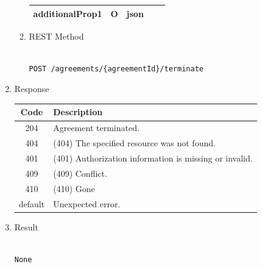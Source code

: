 \begin{enumerate}
\begin{enumerate}
\begin{center}
\begin{tabular}{|p{3cm}|l|p{3cm}|p{3cm}|p{4cm}|}
additionalProp1	& O &	json				&		&		\\
\hline

\end{tabular}
\end{center}

\item REST Method

\begin{tcolorbox}[boxrule=0pt, frame empty]
\begin{verbatim} 

POST /agreements/{agreementId}/terminate

\end{verbatim}
\end{tcolorbox}

\end{enumerate}

\item Response

\begin{center}
\begin{tabular}{|c|l|} 
\hline
\rowcolor{lightgray}	Code 		& 	Description \\
\hline
204	 		&	Agreement terminated. \\
\hline
404			&	(404) The specified resource was not found. \\
\hline
401			&	(401) Authorization information is missing or invalid. \\
\hline
409			&	(409) Conflict. \\
\hline
410			&	(410) Gone \\
\hline
default		&	Unexpected error. \\
\hline
\end{tabular}
\end{center}

\item Result

\begin{tcolorbox}[boxrule=0pt, frame empty]
\begin{verbatim}

None

\end{verbatim}
\end{tcolorbox}



\end{enumerate}
